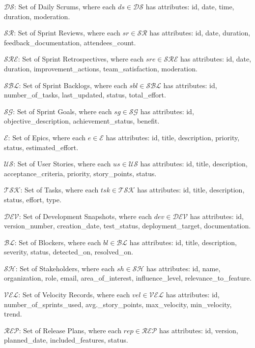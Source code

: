 \documentclass[12pt]{article}
\begin{document}
    \item $ \mathcal{DS} $: Set of Daily Scrums, where each $ ds \in \mathcal{DS} $ has attributes: id, date, time, duration, moderation.
    \item $ \mathcal{SR} $: Set of Sprint Reviews, where each $ sr \in \mathcal{SR} $ has attributes: id, date, duration, feedback\_documentation, attendees\_count.
    \item $ \mathcal{SRE} $: Set of Sprint Retrospectives, where each $ sre \in \mathcal{SRE} $ has attributes: id, date, duration, improvement\_actions, team\_satisfaction, moderation.
    \item $ \mathcal{SBL} $: Set of Sprint Backlogs, where each $ sbl \in \mathcal{SBL} $ has attributes: id, number\_of\_tasks, last\_updated, status, total\_effort.
    \item $ \mathcal{SG} $: Set of Sprint Goals, where each $ sg \in \mathcal{SG} $ has attributes: id, objective\_description, achievement\_status, benefit.
    \item $ \mathcal{E} $: Set of Epics, where each $ e \in \mathcal{E} $ has attributes: id, title, description, priority, status, estimated\_effort.
    \item $ \mathcal{US} $: Set of User Stories, where each $ us \in \mathcal{US} $ has attributes: id, title, description, acceptance\_criteria, priority, story\_points, status.
    \item $ \mathcal{TSK} $: Set of Tasks, where each $ tsk \in \mathcal{TSK} $ has attributes: id, title, description, status, effort, type.
    \item $ \mathcal{DEV} $: Set of Development Snapshots, where each $ dev \in \mathcal{DEV} $ has attributes: id, version\_number, creation\_date, test\_status, deployment\_target, documentation.
    \item $ \mathcal{BL} $: Set of Blockers, where each $ bl \in \mathcal{BL} $ has attributes: id, title, description, severity, status, detected\_on, resolved\_on.
    \item $ \mathcal{SH} $: Set of Stakeholders, where each $ sh \in \mathcal{SH} $ has attributes: id, name, organization, role, email, area\_of\_interest, influence\_level, relevance\_to\_feature.
    \item $ \mathcal{VEL} $: Set of Velocity Records, where each $ vel \in \mathcal{VEL} $ has attributes: id, number\_of\_sprints\_used, avg.\_story\_points, max\_velocity, min\_velocity, trend.
    \item $ \mathcal{REP} $: Set of Release Plans, where each $ rep \in \mathcal{REP} $ has attributes: id, version, planned\_date, included\_features, status.
\end{document}
